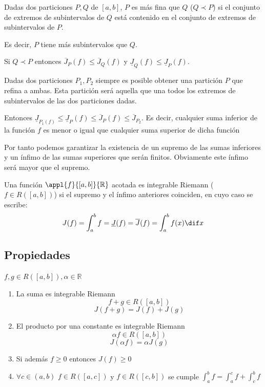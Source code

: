 \documentclass{apuntes}
\begin{document}
\begin{defn}[Finura]
Dadas dos particiones $P,Q$ de $[a,b]$, $P$ es más fina que $Q$ ($Q\prec P$) si el conjunto de extremos de subintervalos de $Q$ está contenido en el conjunto de extremos de subintervalos de $P$.

Es decir, $P$ tiene más subintervalos que $Q$.
\end{defn}

Si $Q\prec P$ entonces $\overline{J}_P(f) \leq \overline{J}_Q(f)$ y $\underline{J}_Q(f) \leq \underline{J}_P(f)$.

Dadas dos particiones $P_1,P_2$ siempre es posible obtener una partición $P$ que refina a ambas. Esta partición será aquella que una todos los extremos de subintervalos de las dos particiones dadas.

Entonces $\underline{J}_{P_1(f)} \leq \underline{J}_P(f) \leq \overline{J}_P(f) \leq \overline{J}_{P_2}$. Es decir, cualquier suma inferior de la función $f$ es menor o igual que cualquier suma superior de dicha función

Por tanto podemos garantizar la existencia de un supremo de las sumas inferiores y un ínfimo de las sumas superiores que serán finitos. Obviamente este ínfimo será mayor que el supremo.

\begin{defn}
Una función $\appl{f}{[a,b]}{\mathbb{R}}$ acotada es integrable Riemann ($f \in R([a,b])$) si el supremo y el ínfimo anteriores coinciden, en cuyo caso se escribe:
\[ J(f) = \int_a^b f = \underline{J}(f) = \overline{J}(f) = \int_a^b f(x) \dif x \]
\end{defn}

\subsection{Propiedades}
$f,g \in R([a,b]), \alpha \in \mathbb{R}$
\begin{enumerate}
\item La suma es integrable Riemann
\[f + g \in R([a,b])\]\[ J(f+g) = J(f) + J(g)\]
\item El producto por una constante es integrable Riemann
\[\alpha f \in R([a,b])\] \[ J(\alpha f) = \alpha J(g)\]
\item Si además $f\geq 0$ entonces $J(f)\geq 0$
\item $\forall c \in (a,b)$ $f\in R([a,c])$  y $f\in R([c,b])$ se cumple
$\int_a^b f = \int_a^c f + \int_c^b f$
\end{enumerate}
\end{document}
